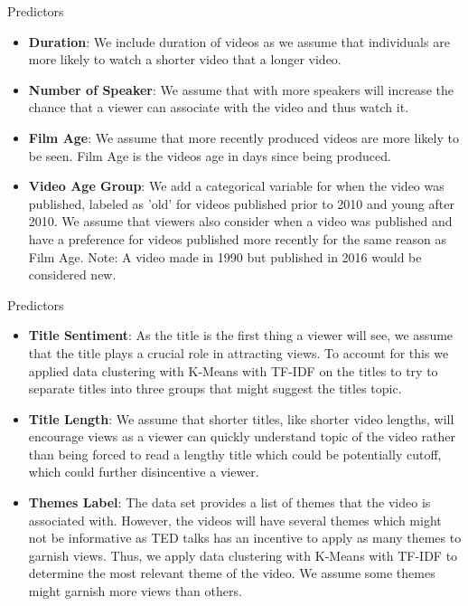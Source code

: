 \begin{frame}{Predictors}
\begin{itemize}
	\item \textbf{Duration}: We include duration of videos as we assume that individuals are more likely to watch a shorter video that a longer video.
	\item \textbf{Number of Speaker}: We assume that with more speakers will increase the chance that a viewer can associate with the video and thus watch it. 
	\item \textbf{Film Age}: We assume that more recently produced videos are more likely to be seen. Film Age is the videos age in days since being produced.
	\item \textbf{Video Age Group}: We add a categorical variable for when the video was published, labeled as 'old' for videos published prior to 2010 and young after 2010.  We assume that viewers also consider when a video was published and have a preference for videos published more recently for the same reason as Film Age. Note: A video made in 1990 but published in 2016 would be considered new.
\end{itemize}
\end{frame}
\begin{frame}{Predictors}
	\begin{itemize}
		\item \textbf{Title Sentiment}: As the title is the first thing a viewer will see, we assume that the title plays a crucial role in attracting views. To account for this we applied data clustering with K-Means with TF-IDF on the titles to try to separate titles into three groups that might suggest the titles topic.
		\item \textbf{Title Length}: We assume that shorter titles, like shorter video lengths, will encourage views as a viewer can quickly understand topic of the video rather than being forced to read a lengthy title which could be potentially cutoff, which could further disincentive a viewer.
		\item \textbf{Themes Label}: The data set provides a list of themes that the video is associated with. However, the videos will have several themes which might not be informative as TED talks has an incentive to apply as many themes to garnish views. Thus, we apply data clustering with K-Means with TF-IDF to determine the most relevant theme of the video. We assume some themes might garnish more views than others. 
	\end{itemize}
\end{frame}

\begin{frame}{}
	
\end{frame}


